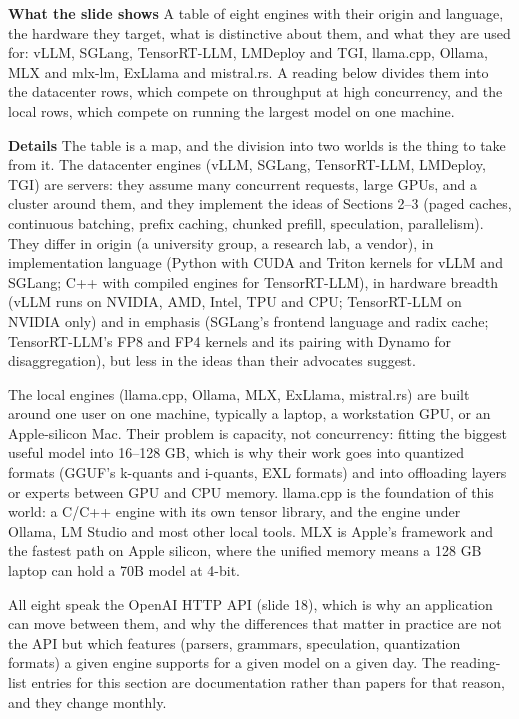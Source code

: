 \documentclass[11pt,letterpaper]{article}
\newcommand{\para}[1]{\medskip\noindent\textbf{#1}\quad}
\begin{document}
\para{What the slide shows} A table of eight engines with their origin and language, the hardware they target, what is distinctive about them, and what they are used for: vLLM, SGLang, TensorRT-LLM, LMDeploy and TGI, llama.cpp, Ollama, MLX and mlx-lm, ExLlama and mistral.rs. A reading below divides them into the datacenter rows, which compete on throughput at high concurrency, and the local rows, which compete on running the largest model on one machine.

\para{Details} The table is a map, and the division into two worlds is the thing to take from it. The datacenter engines (vLLM, SGLang, TensorRT-LLM, LMDeploy, TGI) are servers: they assume many concurrent requests, large GPUs, and a cluster around them, and they implement the ideas of Sections 2--3 (paged caches, continuous batching, prefix caching, chunked prefill, speculation, parallelism). They differ in origin (a university group, a research lab, a vendor), in implementation language (Python with CUDA and Triton kernels for vLLM and SGLang; C++ with compiled engines for TensorRT-LLM), in hardware breadth (vLLM runs on NVIDIA, AMD, Intel, TPU and CPU; TensorRT-LLM on NVIDIA only) and in emphasis (SGLang's frontend language and radix cache; TensorRT-LLM's FP8 and FP4 kernels and its pairing with Dynamo for disaggregation), but less in the ideas than their advocates suggest.

The local engines (llama.cpp, Ollama, MLX, ExLlama, mistral.rs) are built around one user on one machine, typically a laptop, a workstation GPU, or an Apple-silicon Mac. Their problem is capacity, not concurrency: fitting the biggest useful model into 16--128 GB, which is why their work goes into quantized formats (GGUF's k-quants and i-quants, EXL formats) and into offloading layers or experts between GPU and CPU memory. llama.cpp is the foundation of this world: a C/C++ engine with its own tensor library, and the engine under Ollama, LM Studio and most other local tools. MLX is Apple's framework and the fastest path on Apple silicon, where the unified memory means a 128 GB laptop can hold a 70B model at 4-bit.

All eight speak the OpenAI HTTP API (slide 18), which is why an application can move between them, and why the differences that matter in practice are not the API but which features (parsers, grammars, speculation, quantization formats) a given engine supports for a given model on a given day. The reading-list entries for this section are documentation rather than papers for that reason, and they change monthly.
\end{document}
